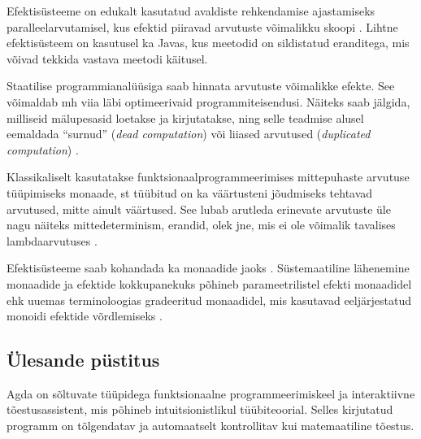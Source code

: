 \documentclass[a4paper,12pt]{article}
\begin{document}
Efektisüsteeme on edukalt kasutatud avaldiste rehkendamise ajastamiseks paralleelarvutamisel, kus efektid piiravad arvutuste võimalikku skoopi \cite{Lucassen1988}.
Lihtne efektisüsteem on kasutusel ka Javas, kus meetodid on sildistatud eranditega, mis võivad tekkida vastava meetodi käitusel. 

Staatilise programmianalüüsiga saab hinnata arvutuste võimalikke efekte.
See võimaldab mh viia läbi optimeerivaid programmiteisendusi.
Näiteks saab jälgida, milliseid mälupesasid loetakse ja kirjutatakse, ning selle teadmise alusel eemaldada ``surnud'' (\emph{dead computation}) või liiased arvutused (\emph{duplicated computation}) \cite{Benton2006}.

Klassikaliselt kasutatakse funktsionaalprogrammeerimises mittepuhaste arvutuse tüüpimiseks monaade, st tüübitud on ka väärtusteni jõudmiseks tehtavad arvutused, mitte ainult väärtused.
See lubab arutleda erinevate arvutuste üle nagu näiteks mittedeterminism, erandid, olek jne, mis ei ole võimalik tavalises lambdaarvutuses \cite{Moggi1989}.

Efektisüsteeme saab kohandada ka monaadide jaoks \cite{Wadler1998}.
Süstemaatiline lähenemine monaadide ja efektide kokkupanekuks põhineb parameetrilistel efekti monaadidel ehk uuemas terminoloogias gradeeritud monaadidel, mis kasutavad eeljärjestatud monoidi efektide võrdlemiseks \cite{Katsumata2014}.

\subsection{Ülesande püstitus}




Agda on sõltuvate tüüpidega funktsionaalne programmeerimiskeel ja interaktiivne tõestusassistent,
mis põhineb intuitsionistlikul tüübiteoorial.
Selles kirjutatud programm on tõlgendatav ja automaatselt kontrollitav kui matemaatiline tõestus.
\end{document}
